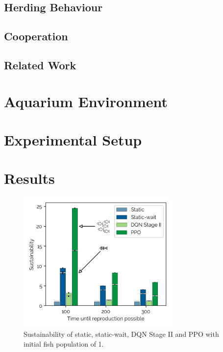 \documentclass[letterpaper]{article}
\begin{document}
\blindtext[3]

\subsection{Herding Behaviour}

\blindtext[2]

\subsection{Cooperation}

\blindtext[2]

\subsection{Related Work}

\blindtext[5]

\section{Aquarium Environment}

\blindtext[5]

\section{Experimental Setup}

\blindtext[2]

\section{Results}

\begin{figure}[t]
\begin{center}
\includegraphics[width=8cm]{figures/dqncomp1fish_2.png}
\caption{Sustainability of static, static-wait, DQN Stage II and PPO with initial fish population of 1.}
\label{fig:dqncomp1}
\end{center}
\end{figure}
\end{document}
